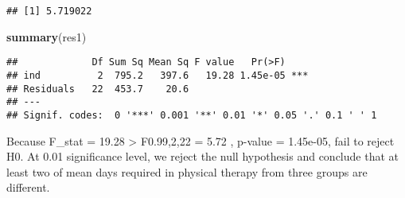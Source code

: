 \documentclass[]{article}
\newenvironment{Shaded}{\begin{snugshade}}{\end{snugshade}}
\newcommand{\KeywordTok}[1]{\textcolor[rgb]{0.13,0.29,0.53}{\textbf{#1}}}
\newcommand{\DataTypeTok}[1]{\textcolor[rgb]{0.13,0.29,0.53}{#1}}
\newcommand{\DecValTok}[1]{\textcolor[rgb]{0.00,0.00,0.81}{#1}}
\newcommand{\FloatTok}[1]{\textcolor[rgb]{0.00,0.00,0.81}{#1}}
\newcommand{\StringTok}[1]{\textcolor[rgb]{0.31,0.60,0.02}{#1}}
\newcommand{\CommentTok}[1]{\textcolor[rgb]{0.56,0.35,0.01}{\textit{#1}}}
\newcommand{\OperatorTok}[1]{\textcolor[rgb]{0.81,0.36,0.00}{\textbf{#1}}}
\newcommand{\NormalTok}[1]{#1}
\begin{document}
\begin{Shaded}
\end{Shaded}

\begin{verbatim}
## [1] 5.719022
\end{verbatim}

\begin{Shaded}
\begin{Highlighting}[]
\KeywordTok{summary}\NormalTok{(res1)}
\end{Highlighting}
\end{Shaded}

\begin{verbatim}
##             Df Sum Sq Mean Sq F value   Pr(>F)    
## ind          2  795.2   397.6   19.28 1.45e-05 ***
## Residuals   22  453.7    20.6                     
## ---
## Signif. codes:  0 '***' 0.001 '**' 0.01 '*' 0.05 '.' 0.1 ' ' 1
\end{verbatim}

Because F\_stat = 19.28 \textgreater{} F0.99,2,22 = 5.72 , p-value =
1.45e-05, fail to reject H0. At 0.01 significance level, we reject the
null hypothesis and conclude that at least two of mean days required in
physical therapy from three groups are different.
\end{document}
